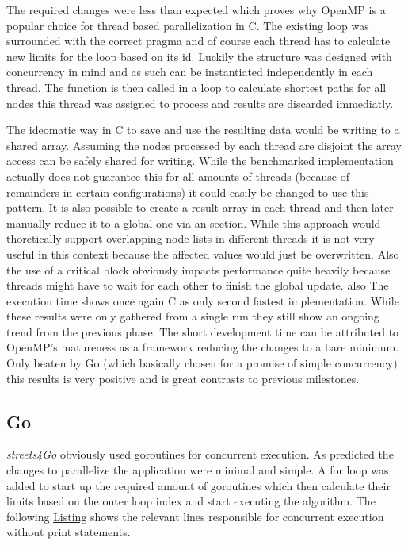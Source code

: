 The required changes were less than expected which proves why OpenMP is a popular choice for thread based parallelization in C. The existing loop was surrounded with the correct pragma and of course each thread has to calculate new limits for the loop based on its id. Luckily the  structure was designed with concurrency in mind and as such can be instantiated independently in each thread. The  function is then called in a loop to calculate shortest paths for all nodes this thread was assigned to process and results are discarded immediatly.

The ideomatic way in C to save and use the resulting data would be writing to a shared array. Assuming the nodes processed by each thread are disjoint the array access can be safely shared for writing. While the benchmarked implementation actually does not guarantee this for all amounts of threads (because of remainders in certain configurations) it could easily be changed to use this pattern. It is also possible to create a result array in each thread and then later manually reduce it to a global one via an  section. While this approach would thoretically support overlapping node lists in different threads it is not very useful in this context because the affected values would just be overwritten. Also the use of a critical block obviously impacts performance quite heavily because threads might have to wait for each other to finish the global update.
also
The execution time shows once again C as only second fastest implementation. While these results were only gathered from a single run they still show an ongoing trend from the previous phase. The short development time can be attributed to OpenMP's matureness as a framework reducing the changes to a bare minimum. Only beaten by Go (which basically chosen for a promise of simple concurrency) this results is very positive and is great contrasts to previous milestones.

\subsection{Go}
\label{subsec:Implementation::ParallelBenchmark::Go}

\textit{streets4Go} obviously used \glspl{goroutine} for concurrent execution. As predicted the changes to parallelize the application were minimal and simple. A for loop was added to start up the required amount of \glspl{goroutine} which then calculate their limits based on the outer loop index and start executing the algorithm. The following \hyperref[lst:goroutines.go]{Listing} shows the relevant lines responsible for concurrent execution without print statements.
\\


